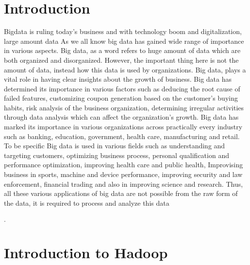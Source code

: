

\maketitle

\section{Introduction}

Bigdata is ruling today's business and with technology boom and digitalization, 
large amount data As we all know big data has gained wide range of importance in
various aspects. Big data, as a word refers to huge amount of data which are 
both organized and disorganized. However, the important thing here is not
the amount of data, instead how this data is used by organizations. Big data,
plays a vital role in having clear insights about the growth of business.
Big data has determined its importance in various factors such as deducing the 
root cause of failed features, customizing coupon generation based on the 
customer’s buying habits, risk analysis of the business organization, 
determining irregular activities through data analysis which can affect the 
organization’s growth. Big data has marked its importance in various 
organizations across practically every industry such as banking, education, 
government, health care, manufacturing and retail. To be specific  Big data is 
used in various fields such as understanding and targeting customers, optimizing
business process, personal qualification and performance optimization, 
improving health care and public health, Improvising business in sports, 
machine and device performance, improving security and law enforcement,  
financial trading and also in improving science and research. Thus, all these 
various applications of big data are not possible from the raw form of the 
data, it is required to process and analyze this data

\cite{hid-sp18-406-hadoop-abstract}.

\section{Introduction to Hadoop}

